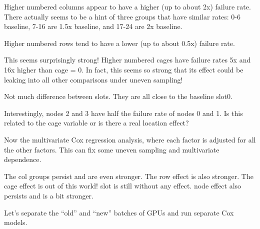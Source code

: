 Higher numbered columns appear to have a higher (up to about 2x)
failure rate. There actually seems to be a hint of three groups that
have similar rates: 0-6 baseline, 7-16 are 1.5x baseline, and 17-24
are 2x baseline. 

Higher numbered rows tend to have a lower (up to about 0.5x) failure rate.

This seems surprisingly strong! Higher numbered cages have failure
rates 5x and 16x higher than cage = 0. In fact, this seems so strong
that its effect could be leaking into all other comparisons under
uneven sampling!

Not much difference between slots. They are all close to the baseline
slot0.

Interestingly, nodes 2 and 3 have half the failure rate of nodes 0 and
1. Is this related to the cage variable or is there a real location
effect?

Now the multivariate Cox regression analysis, where each factor is
adjusted for all the other factors. This can fix some uneven sampling
and multivariate dependence. 

The col groups persist and are even stronger. The row effect is also
stronger. The cage effect is out of this world! slot is still without
any effect. node effect also persists and is a bit stronger. 

Let’s separate the “old” and “new” batches of GPUs and run separate
Cox models. 
